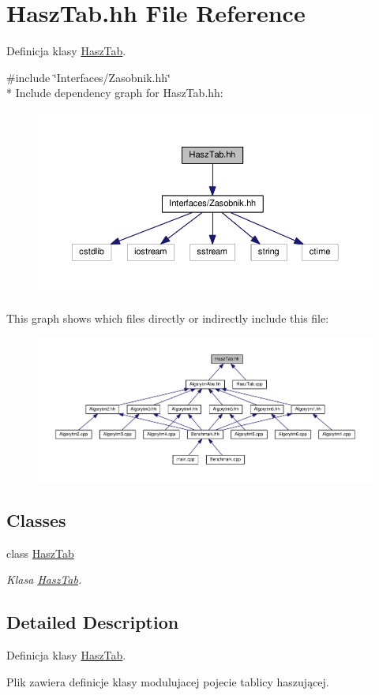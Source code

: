 \hypertarget{a00038}{}\section{Hasz\+Tab.\+hh File Reference}
\label{a00038}


Definicja klasy \hyperlink{a00010}{Hasz\+Tab}.  


{\ttfamily \#include \char`\"{}Interfaces/\+Zasobnik.\+hh\char`\"{}}\\*
Include dependency graph for Hasz\+Tab.\+hh\+:
\nopagebreak
\begin{figure}[H]
\begin{center}
\leavevmode
\includegraphics[width=350pt]{a00082}
\end{center}
\end{figure}
This graph shows which files directly or indirectly include this file\+:
\nopagebreak
\begin{figure}[H]
\begin{center}
\leavevmode
\includegraphics[width=350pt]{a00083}
\end{center}
\end{figure}
\subsection*{Classes}
\begin{DoxyCompactItemize}
\item 
class \hyperlink{a00010}{Hasz\+Tab}
\begin{DoxyCompactList}\small\item\em Klasa \hyperlink{a00010}{Hasz\+Tab}. \end{DoxyCompactList}\end{DoxyCompactItemize}


\subsection{Detailed Description}
Definicja klasy \hyperlink{a00010}{Hasz\+Tab}. 

Plik zawiera definicje klasy modulujacej pojecie tablicy haszującej. 
